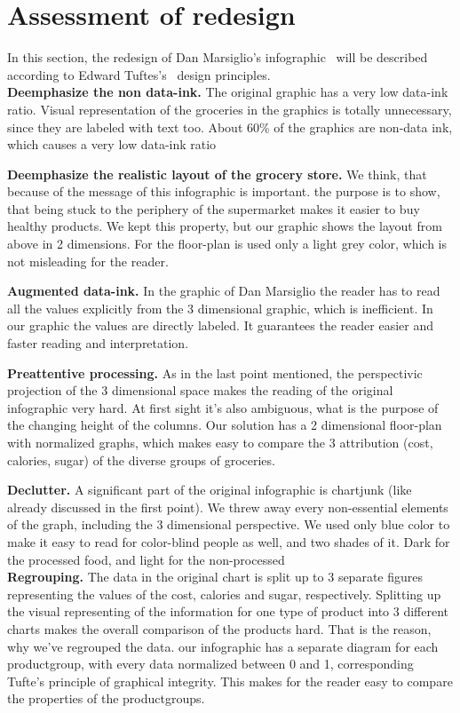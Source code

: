 \section{Assessment of redesign}

In this section, the redesign of Dan Marsiglio's
infographic~\cite{DanMarsiglio2008} will be described according to Edward
Tuftes's~\cite{Tufte2001} design principles.\\

\textbf{Deemphasize the non data-ink.} The original graphic has a very
low data-ink ratio. Visual representation of the groceries in the graphics
is totally unnecessary, since they are labeled with text too. About 60\% of
the graphics are non-data ink, which causes a very low data-ink ratio

\textbf{Deemphasize the realistic layout of the grocery store.} We
think, that because of the message of this infographic is important. the
purpose is to show, that being stuck to the periphery of the supermarket
makes it easier to buy healthy products. We kept this property, but our
graphic shows the layout from above in 2 dimensions. For the floor-plan is
used only a light grey color, which is not misleading for the reader.

\textbf{Augmented data-ink.} In the graphic of Dan Marsiglio the reader
has to read all the values explicitly from the 3 dimensional graphic, which
is inefficient. In our graphic the values are directly labeled. It
guarantees the reader easier and faster reading and interpretation.

\textbf{Preattentive processing.} As in the last point mentioned, the
perspectivic projection of the 3 dimensional space makes the reading of
the original infographic very hard. At first sight it's also ambiguous,
what is the purpose of the changing height of the columns. Our solution
has a 2 dimensional floor-plan with normalized graphs, which makes easy to
compare the 3 attribution (cost, calories, sugar) of the diverse groups of
groceries.

\textbf{Declutter.} A significant part of the original infographic is
chartjunk (like already discussed in the first point). We threw away every
non-essential elements of the graph, including the 3 dimensional
perspective. We used only blue color to make it easy to read for color-blind
people as well, and two shades of it. Dark for the processed food, and light
for the non-processed\\

\textbf{Regrouping.} The data in the original chart is split up to 3
separate figures representing the values of the cost, calories and sugar,
respectively. Splitting up the visual representing of the information for
one type of product into 3 different charts makes the overall comparison of
the products hard. That is the reason, why we've regrouped the data. our
infographic has a separate  diagram for each productgroup, with every data
normalized between 0 and 1, corresponding Tufte's principle of graphical
integrity. This makes for the reader easy to compare the properties of the
productgroups.


